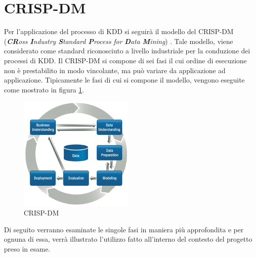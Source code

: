 \section{CRISP-DM}
Per l'applicazione del processo di KDD si seguirà il modello del CRISP-DM (\emph{\textbf{CR}oss \textbf{I}ndustry \textbf{S}tandard \textbf{P}rocess for \textbf{D}ata \textbf{M}ining})
\cite{wirth2000crisp}. Tale modello, viene considerato come standard riconosciuto a livello industriale per la conduzione dei processi di KDD.
Il CRISP-DM si compone di sei fasi il cui ordine di esecuzione non è prestabilito in modo vincolante, ma può variare da applicazione ad applicazione. Tipicamente le fasi di cui si compone il modello, vengono eseguite come mostrato in figura \ref{CRISPDM}.

\begin{figure}[hbtp]
\centering
\includegraphics[width=0.5\textwidth]{./images/CRISPDM.png}
\caption{CRISP-DM}
\label{CRISPDM}
\end{figure}

Di seguito verranno esaminate le singole fasi in maniera più approfondita e per ognuna di essa, verrà illustrato l'utilizzo fatto all'interno del contesto del progetto preso in esame.